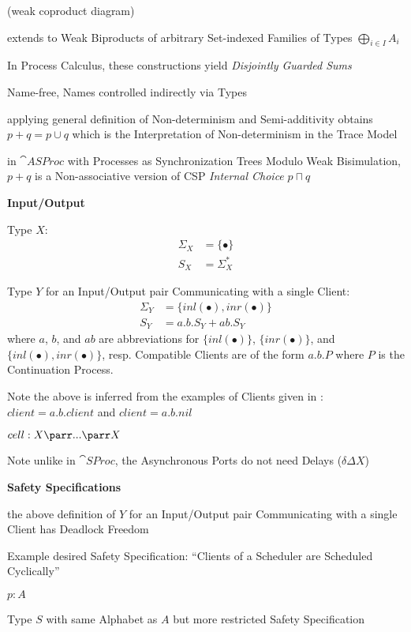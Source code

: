 (weak coproduct diagram) %

extends to Weak Biproducts of arbitrary Set-indexed Families of Types
$\bigoplus_{i \in I} A_i$

In Process Calculus, these constructions yield \emph{Disjointly
  Guarded Sums}

Name-free, Names controlled indirectly via Types

applying general definition of Non-determinism and Semi-additivity
obtains $p + q = p \cup q$ which is the Interpretation of
Non-determinism in the Trace Model

in $\cat{ASProc}$ with Processes as Synchronization Trees Modulo Weak
Bisimulation, $p+q$ is a Non-associative version of CSP \emph{Internal
  Choice} $p \sqcap q$


\asterism


\textbf{Input/Output}

Type $X$:
\begin{align*}
  \Sigma_X &= \{\bullet\} \\
  S_X &= \Sigma_X^*
\end{align*}

Type $Y$ for an Input/Output pair Communicating with a single Client:
\begin{align*}
  \Sigma_Y &= \{inl(\bullet), inr(\bullet)\} \\
  S_Y &= a.b.S_Y + ab.S_Y
\end{align*}
where $a$, $b$, and $ab$ are abbreviations for $\{inl(\bullet)\}$,
$\{inr(\bullet)\}$, and $\{inl(\bullet),inr(\bullet)\}$, resp.
Compatible Clients are of the form $a.b.P$ where $P$ is the
Continuation Process.

\interrobang Note the above is inferred from the examples of Clients
given in \cite{abramsky-gay-nagarajan96}: $client = a.b.client$ and
$client = a.b.nil$

$cell : X \parr ... \parr X$

\fist Note unlike in $\cat{SProc}$, the Asynchronous Ports do not need
Delays ($\delta\Delta X$)


\textbf{Safety Specifications}

the above definition of $Y$ for an Input/Output pair Communicating
with a single Client has Deadlock Freedom

Example desired Safety Specification: ``Clients of a Scheduler are
Scheduled Cyclically''

$p : A$

Type $S$ with same Alphabet as $A$ but more restricted Safety
Specification

